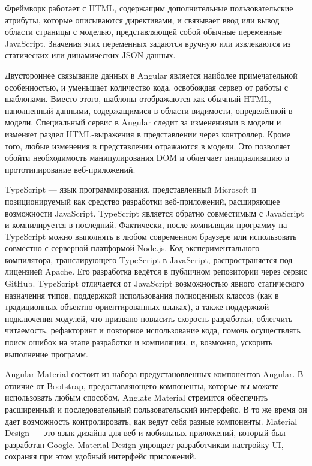 Фреймворк работает с HTML, содержащим дополнительные пользовательские атрибуты, которые описываются директивами, и связывает ввод или вывод области страницы с моделью, представляющей собой обычные переменные JavaScript.
Значения этих переменных задаются вручную или извлекаются из статических или динамических JSON-данных.

Двустороннее связывание данных в Angular является наиболее примечательной особенностью, и уменьшает количество кода, освобождая сервер от работы с шаблонами.
Вместо этого, шаблоны отображаются как обычный HTML, наполненный данными, содержащимися в области видимости, определённой в модели.
Специальный сервис в Angular следит за изменениями в модели и изменяет раздел HTML-выражения в представлении через контроллер.
Кроме того, любые изменения в представлении отражаются в модели.
Это позволяет обойти необходимость манипулирования DOM и облегчает инициализацию и прототипирование веб-приложений.\cite{web-angular}

TypeScript — язык программирования, представленный Microsoft и позиционируемый как средство разработки веб-приложений, расширяющее возможности JavaScript.
TypeScript является обратно совместимым с JavaScript и компилируется в последний.
Фактически, после компиляции программу на TypeScript можно выполнять в любом современном браузере или использовать совместно с серверной платформой Node.js.
Код экспериментального компилятора, транслирующего TypeScript в JavaScript, распространяется под лицензией Apache.
Его разработка ведётся в публичном репозитории через сервис GitHub.
TypeScript отличается от JavaScript возможностью явного статического назначения типов, поддержкой использования полноценных классов (как в традиционных объектно-ориентированных языках), а также поддержкой подключения модулей, что призвано повысить скорость разработки, облегчить читаемость, рефакторинг и повторное использование кода, помочь осуществлять поиск ошибок на этапе разработки и компиляции, и, возможно, ускорить выполнение программ.\cite{web-typescript}

Angular Material состоит из набора предустановленных компонентов Angular.
В отличие от Bootstrap, предоставляющего компоненты, которые вы можете использовать любым способом, Anglate Material стремится обеспечить расширенный и последовательный пользовательский интерфейс.
В то же время он дает возможность контролировать, как ведут себя разные компоненты.
Material Design — это язык дизайна для веб и мобильных приложений, который был разработан Google.
Material Design упрощает разработчикам настройку \hyperlink{gloss:ui}{UI}, сохраняя при этом удобный интерфейс приложений.


